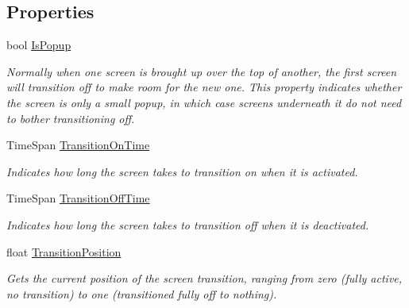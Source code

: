 \subsection*{Properties}
\begin{DoxyCompactItemize}
\item 
bool \hyperlink{classCityMania_1_1TEMP_1_1GUI_aba780c16bbff79f84ce296b5139a0571}{IsPopup}
\begin{DoxyCompactList}\small\item\em Normally when one screen is brought up over the top of another, the first screen will transition off to make room for the new one. This property indicates whether the screen is only a small popup, in which case screens underneath it do not need to bother transitioning off. \item\end{DoxyCompactList}\item 
TimeSpan \hyperlink{classCityMania_1_1TEMP_1_1GUI_ae01a201eb5d0f8869e74f887b8a4f496}{TransitionOnTime}
\begin{DoxyCompactList}\small\item\em Indicates how long the screen takes to transition on when it is activated. \item\end{DoxyCompactList}\item 
TimeSpan \hyperlink{classCityMania_1_1TEMP_1_1GUI_abbc109958a9298a2948c408e941ad538}{TransitionOffTime}
\begin{DoxyCompactList}\small\item\em Indicates how long the screen takes to transition off when it is deactivated. \item\end{DoxyCompactList}\item 
float \hyperlink{classCityMania_1_1TEMP_1_1GUI_a020b4f1b79ea5a07de5f87c1156dabed}{TransitionPosition}
\begin{DoxyCompactList}\small\item\em Gets the current position of the screen transition, ranging from zero (fully active, no transition) to one (transitioned fully off to nothing). \item\end{DoxyCompactList}\item 

\end{DoxyCompactItemize}
